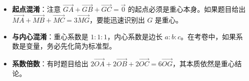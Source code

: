 \begin{trapbox}
\begin{itemize}
    \item \textbf{起点混淆}：注意 $\vec{GA}+\vec{GB}+\vec{GC}=\vec{0}$ 的起点必须是重心本身。如果题目给出 $\vec{MA}+\vec{MB}+\vec{MC}=3\vec{MG}$，要能迅速识别出 $G$ 是重心。
    \item \textbf{与内心混淆}：重心系数是 $1:1:1$，内心系数是边长 $a:b:c$。在考卷中，如果系数是变量，务必先化简为标准型。
    \item \textbf{系数倍数}：有时题目给出 $2\vec{OA} + 2\vec{OB} + 2\vec{OC} = 6\vec{OG}$，其本质依然是重心结论。
\end{itemize}
\end{trapbox}